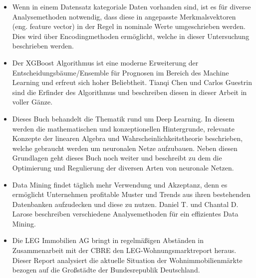 \begin{itemize}
    \item Wenn in einem Datensatz kategoriale Daten vorhanden sind, ist es für 
    diverse Analysemethoden notwendig, dass diese in angepasste Merkmalsvektoren 
    (eng. feature vector) in der Regel in nominale Werte umgeschrieben werden.
    Dies wird über Encodingmethoden ermöglicht, welche in dieser Untersuchung
    beschrieben werden.
\end{itemize}

\begin{itemize}
    \item Der XGBoost Algorithmus ist eine moderne Erweiterung der 
    Entscheidungsbäume/Ensemble für Prognosen im Bereich des Machine Learning und 
    erfreut sich hoher Beliebtheit. Tianqi Chen und Carlos Guestrin sind die Erfinder 
    des Algorithmus und beschreiben diesen in dieser Arbeit in voller Gänze.
\end{itemize}
\newpage
{}
\begin{itemize}
    \item Dieses Buch behandelt die Thematik rund um Deep Learning. In diesem werden die
    mathematischen und konzeptionellen Hintergrunde, relevante Konzepte der 
    linearen Algebra und Wahrscheinlichkeitstheorie beschrieben, welche gebraucht werden um neuronalen
    Netze aufzubauen. Neben diesen Grundlagen geht dieses Buch noch weiter und beschreibt zu dem
    die Optimierung und Regulierung der diversen Arten von neuronale Netzen.
\end{itemize}

\begin{itemize}
    \item Data Mining findet täglich mehr Verwendung und Akzeptanz, denn es ermöglicht Unternehmen 
    profitable Muster und Trends aus ihren bestehenden Datenbanken aufzudecken und diese zu
    nutzen. Daniel T. und Chantal D. Larose beschreiben verschiedene Analysemethoden für
    ein effizientes Data Mining.
\end{itemize}

\begin{itemize}
    \item Die LEG Immobilien AG bringt in regelmäßigen Abständen in Zusammenarbeit mit der 
    CBRE den LEG-Wohnungsmarktreport heraus. Dieser Report analysiert die aktuelle Situation 
    der Wohnimmobilienmärkte bezogen auf die Großstädte der Bundesrepublik Deutschland.
\end{itemize}

